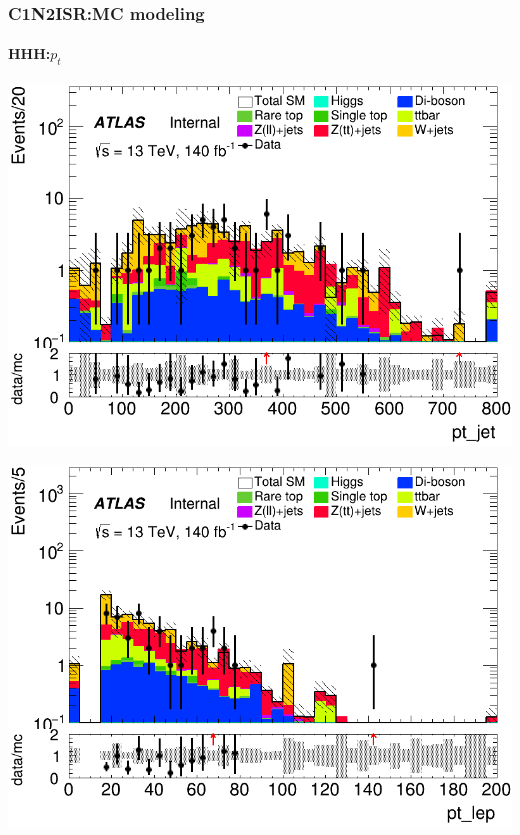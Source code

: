 \documentclass[usenames,dvipsnames]{beamer}
\begin{document}
\begin{frame}
\frametitle{C1N2ISR:MC modeling}
\framesubtitle{HHH:\quad $p_t$}
    \begin{minipage}{0.32\textwidth}
        \centering
        \includegraphics[width=\textwidth]{graphics/HHH_met/HHH_met_pt_jet.png}
    \end{minipage}
    \hfill
    \begin{minipage}{0.32\textwidth}
        \centering
        \includegraphics[width=\textwidth]{graphics/HHH_met/HHH_met_pt_lep.png}
    \end{minipage}
    \hfill
    \begin{minipage}{0.32\textwidth}
        \centering

\end{minipage}
\end{frame}
\end{document}
